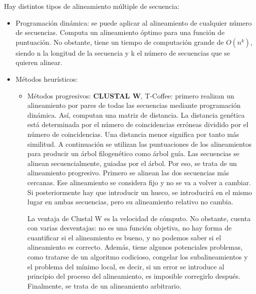 Hay distintos tipos de alineamiento múltiple de secuencia:
\begin{itemize}
\item Programación dinámica: se puede aplicar al alineamiento de cualquier número de secuencias. Computa un alineamiento óptimo para una función de puntuación. No obstante, tiene un tiempo de computación grande de $O(n^k)$, siendo n la longitud de la secuencia y k el número de secuencias que se quieren alinear.
\item Métodos heurísticos:
\begin{itemize}
\item Métodos progresivos: \textbf{CLUSTAL W}, T-Coffee: primero realizan un alineamiento por pares de todas las secuencias mediante programación dinámica. Así, computan una matriz de distancia. La distancia genética está determinada por el número de coincidencias erróneas dividido por el número de coincidencias. Una distancia menor significa por tanto más similitud. A continuación se utilizan las puntuaciones de los alineamientos para producir un árbol filogenético como árbol guía. Las secuencias se alinean secuencialmente, guiadas por el árbol. Por eso, se trata de un alineamiento progresivo. Primero se alinean las dos secuencias más cercanas. Ese alineamiento se considera fijo y no se va a volver a cambiar. Si posteriormente hay que introducir un hueco, se introducirá en el mismo lugar en ambas secuencias, pero su alineamiento relativo no cambia.

La ventaja de Clustal W es la velocidad de cómputo. No obstante, cuenta con varias desventajas: no es una función objetiva, no hay forma de cuantificar si el alineamiento es bueno, y no podemos saber si el alineamiento es correcto. Además, tiene algunos potenciales problemas, como tratarse de un algoritmo codicioso, congelar los subalineamientos y el problema del mínimo local, es decir, si un error se introduce al principio del proceso del alineamiento, es imposible corregirlo después. Finalmente, se trata de un alineamiento arbitrario.


\end{itemize}
\end{itemize}
